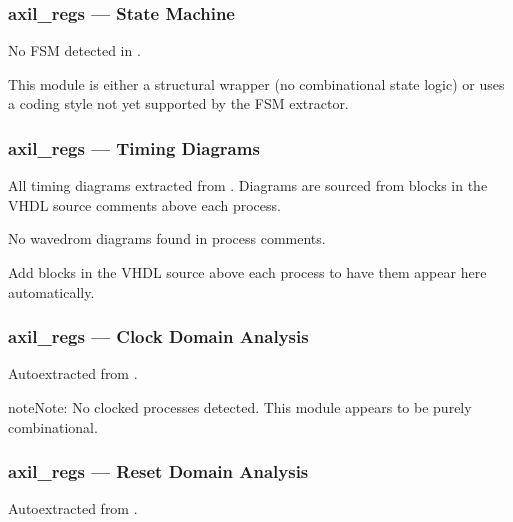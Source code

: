 \documentclass[letterpaper,10pt,english]{sphinxmanual}
\begin{document}
\sphinxstepscope


\subsubsection{axil\_regs — State Machine}
\label{\detokenize{modules/axil_regs/fsm:axil-regs-state-machine}}\label{\detokenize{modules/axil_regs/fsm::doc}}
\sphinxAtStartPar
No FSM detected in .

\sphinxAtStartPar
This module is either a structural wrapper (no combinational
state logic) or uses a coding style not yet supported by the
FSM extractor.

\sphinxstepscope


\subsubsection{axil\_regs — Timing Diagrams}
\label{\detokenize{modules/axil_regs/timing:axil-regs-timing-diagrams}}\label{\detokenize{modules/axil_regs/timing::doc}}
\sphinxAtStartPar
All timing diagrams extracted from .
Diagrams are sourced from  blocks in the VHDL
source comments above each process.

\sphinxAtStartPar
No wavedrom diagrams found in process comments.

\sphinxAtStartPar
Add  blocks in the VHDL source above each
process to have them appear here automatically.

\sphinxstepscope


\subsubsection{axil\_regs — Clock Domain Analysis}
\label{\detokenize{modules/axil_regs/cdc:axil-regs-clock-domain-analysis}}\label{\detokenize{modules/axil_regs/cdc::doc}}
\sphinxAtStartPar
Auto\sphinxhyphen{}extracted from .

\begin{sphinxadmonition}{note}{Note:}
\sphinxAtStartPar
No clocked processes detected. This module appears to be purely combinational.
\end{sphinxadmonition}

\sphinxstepscope


\subsubsection{axil\_regs — Reset Domain Analysis}
\label{\detokenize{modules/axil_regs/reset:axil-regs-reset-domain-analysis}}\label{\detokenize{modules/axil_regs/reset::doc}}
\sphinxAtStartPar
Auto\sphinxhyphen{}extracted from .
\end{document}
